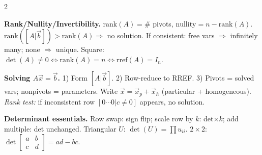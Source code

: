 \documentclass[8pt]{extarticle}
\begin{document}
\begin{multicols}{2}
\begin{tcolorbox}[title={Quick Reference -- Matrix Ops, REF/RREF, Rank/Det, Solving $A\vec x=\vec b$}, colframe=black!60!white, colback=gray!2]
\textbf{Rank/Nullity/Invertibility.}
\(\mathrm{rank}(A)=\#\) pivots,\; \(\text{nullity}=n-\mathrm{rank}(A)\).
\(\mathrm{rank}([A|\vec b])>\mathrm{rank}(A)\Rightarrow\) no solution.
If consistent: free vars \(\Rightarrow\) infinitely many; none \(\Rightarrow\) unique.
Square: \(\det(A)\neq0 \Leftrightarrow \mathrm{rank}(A)=n \Leftrightarrow \text{rref}(A)=I_n\).

\textbf{Solving \(A\vec x=\vec b\).}
1) Form \([A|\vec b]\). 2) Row-reduce to RREF. 3) Pivots = solved vars; nonpivots = parameters.
Write \(\vec x=\vec x_p+\vec x_h\) (particular + homogeneous).
\emph{Rank test:} if inconsistent row \([0\cdots0|c\neq0]\) appears, no solution.

\textbf{Determinant essentials.}
Row swap: sign flip; scale row by \(k\): det\(\times k\); add multiple: det unchanged.
Triangular \(U\): \(\det(U)=\prod u_{ii}\).
\(2\times2\): \(\det\!\begin{bmatrix}a&b\\c&d\end{bmatrix}=ad-bc\).
\end{tcolorbox}

\end{multicols}
\end{document}
